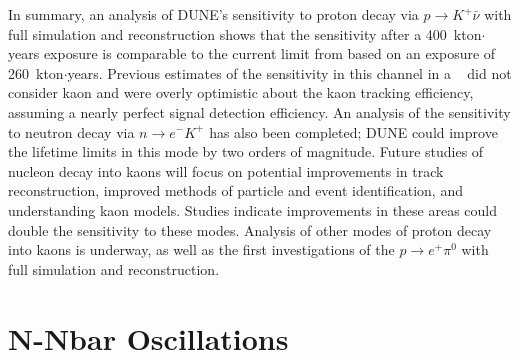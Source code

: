 In summary, an analysis of DUNE's sensitivity to proton decay via $p\rightarrow K^{+} \bar{\nu}$ with full simulation and reconstruction shows that the sensitivity after a 400~kton$\cdot$years exposure
is comparable to the current limit from \superk based on an exposure of 260~kton$\cdot$years.  Previous estimates of the sensitivity in this channel in a \lartpc~\cite{Acciarri:2015uup} did not consider kaon  and were overly optimistic about the kaon tracking efficiency, assuming a nearly perfect signal detection efficiency.  An analysis of the sensitivity to neutron decay via $n\rightarrow e^{-}K^{+}$ has also been completed; DUNE could improve the lifetime limits in this mode by two orders of magnitude.  Future studies of nucleon decay into kaons will focus on potential improvements in track reconstruction, improved methods of particle and event identification, and understanding kaon  models.  Studies indicate improvements in these areas could double the sensitivity to these modes. 
Analysis of other modes of proton decay into kaons is underway, as well as the first investigations of the $p \rightarrow e^{+}\pi^0$ with full simulation and reconstruction.



\section{N-Nbar Oscillations}
\label{sec:nonaccel-nnbar}



